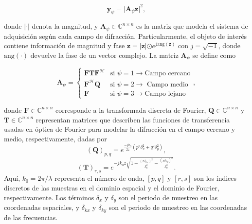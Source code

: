 \begin{equation}
    \mathbf{y}_{\psi}= \vert \mathbf{A}_\psi \mathbf{z} \vert^2,
    \label{eq:diffraction_base}
\end{equation}

donde $\vert \cdot \vert$ denota la magnitud, y $\mathbf{A}_\psi\in\mathbb{C}^{n \times n}$ es la matriz que modela el sistema de adquisición según cada campo de difracción. Particularmente, el objeto de interés contiene información de magnitud y fase $\mathbf{z}=\vert \mathbf{z}|\odot e^{j\mathrm{ang}(\mathbf{z})}$ con $j=\sqrt{-1}$, donde $\mathrm{ang}(\cdot)$ devuelve la fase de un vector complejo. La matriz $\mathbf{A}_\psi$ se define como

\begin{equation}
    \mathbf{A}_\psi = \left\{\begin{matrix}
 \mathbf{F}\mathbf{T}\mathbf{F}^\mathcal{H}    & \text{si } \psi=1\rightarrow \text{Campo cercano}\\ 
 \mathbf{F}^\mathcal{H}\mathbf{Q} &\text{si } \psi=2\rightarrow\text{ Campo medio} \\ 
 \mathbf{F}  &\text{si } \psi=3\rightarrow\text{Campo lejano}
\end{matrix}\right., \label{eq:matrix_a_no_coded}
\end{equation}

donde $\mathbf{F}\in\mathbb{C}^{n\times n}$ corresponde a la transformada discreta de Fourier, $\mathbf{Q}\in\mathbb{C}^{n\times n}$ y $\mathbf{T}\in\mathbb{C}^{n\times n}$ representan matrices que describen las funciones de transferencia usadas en óptica de Fourier  para modelar la difracción en el campo cercano y medio, respectivamente, dadas por
\begin{equation}
(\mathbf{Q})_{p,q}=e^{\frac{-jk_0}{2z}(p^2\delta_x^2+q^2\delta_y^2)},\label{eq:Qfuncion}
\end{equation}
\begin{equation}
(\mathbf{T})_{r,s}=e^{-jk_0z\sqrt{1-\frac{(r\delta_{kx})^2}{k_0^2}-\frac{(s\delta_{ky})^2}{k_0^2}}}.\label{eq:Tfuncion}
\end{equation}
Aquí, $k_0=2\pi/\lambda$ representa el número de onda, $[p,q]$ y $[r,s]$ son los índices discretos de las muestras en el dominio espacial y el dominio de Fourier, respectivamente. Los términos $\delta_x$ y $\delta_y$ son el periodo de muestreo en las coordenadas espaciales, y $\delta_{kx}$ y $\delta_{ky}$ son el periodo de muestreo en las coordenadas de las frecuencias. 

